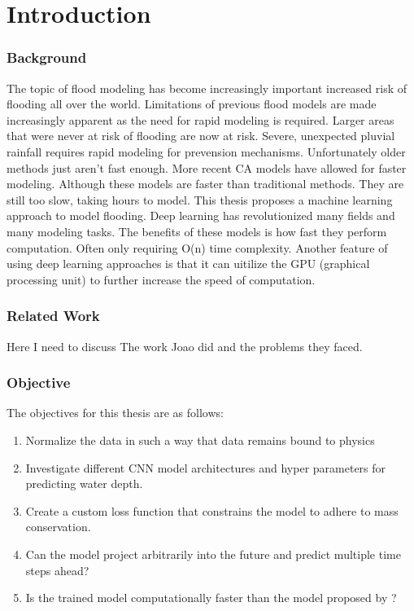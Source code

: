 
\chapter{Introduction} %
\label{Chapter1} %

\subsection{Background}
The topic of flood modeling has become increasingly important increased risk of flooding all over the world. Limitations of previous flood models are made increasingly apparent as the need for rapid modeling is required. Larger areas that were never at risk of flooding are now at risk. Severe, unexpected pluvial rainfall requires rapid modeling for prevension mechanisms. Unfortunately older methods just aren't fast enough. More recent CA models have allowed for faster modeling. Although these models are faster than traditional methods. They are still too slow, taking hours to model. This thesis proposes a machine learning approach to model flooding. Deep learning has revolutionized many fields and many modeling tasks. The benefits of these models is how fast they perform computation. Often only requiring O(n) time complexity. Another feature of using deep learning approaches is that it can uitilize the GPU (graphical processing unit) to further increase the speed of computation. 
\subsection{Related Work}
Here I need to discuss The work Joao did and the problems they faced.
\subsection{Objective}
The objectives for this thesis are as follows:

\begin{enumerate}
	\item Normalize the data in such a way that data remains bound to physics \label{question1}
	\item Investigate different CNN model architectures and hyper parameters for predicting water depth. \label{qustion2} 
	\item Create a custom loss function that constrains the model to adhere to mass conservation. \label{question3}
	\item Can the model project arbitrarily into the future and predict multiple time steps ahead? \label{question4}
	\item Is the trained model computationally faster than the model proposed by \cite{Ghimire}? \label{question5}
\end{enumerate}